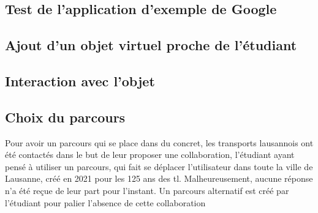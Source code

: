 \subsection{Test de l'application d'exemple de Google}

\subsection{Ajout d'un objet virtuel proche de l'étudiant}

\subsection{Interaction avec l'objet}

\subsection{Choix du parcours}
Pour avoir un parcours qui se place dans du concret, les transports lausannois
ont été contactés dans le but de leur proposer une collaboration, l'étudiant ayant pensé à
utiliser un parcours, qui fait se déplacer l'utilisateur dans toute la ville de Lausanne,
créé en 2021 pour les 125 ans des tl.\cite{hatetVeriteLionsLausannois2021} Malheureusement, aucune réponse n'a été reçue de leur
part pour l'instant. Un parcours alternatif est créé par l'étudiant pour palier l'absence de
cette collaboration




